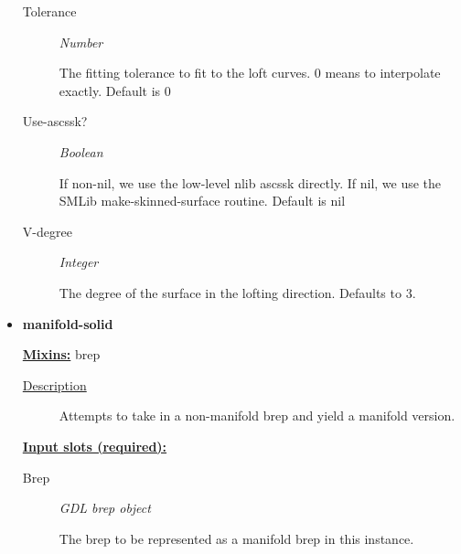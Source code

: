 \documentclass [11pt]{book}
\begin{document}
\begin{itemize}
\begin{description}
\item [Tolerance]
\emph{Number}

 The fitting tolerance to fit to the loft curves.
0 means to interpolate exactly. Default is 0




\item [Use-ascssk?]
\emph{Boolean}

 If non-nil, we use the low-level nlib ascssk directly. If nil, we use
the SMLib make-skinned-surface routine. Default is nil




\item [V-degree]
\emph{Integer}

 The degree of the surface in the lofting direction. Defaults to 3.




\end{description}







\item {}
\label{prim:manifold-solid}
\textbf{manifold-solid}


\textbf{
\underline{Mixins:}} brep





\begin{description}

\item [
\underline{Description}]


Attempts to take in a non-manifold brep and yield a manifold version.



\end{description}








\textbf{
\underline{Input slots (required):}}

\begin{description}

\item [Brep]
\emph{GDL brep object}

 The brep to be represented as a manifold brep in this instance.





\end{description}
\end{itemize}
\end{document}
